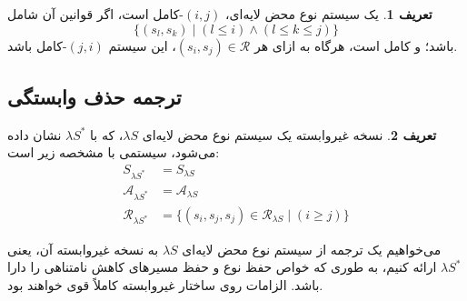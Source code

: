 \documentclass[11pt,twocolumn,a4paper,twoside]{article}
\theoremstyle{definition}
\newtheorem{definition}{تعریف}[section]
\theoremstyle{theorem}
\theoremstyle{definition}
\theoremstyle{definition}
\theoremstyle{definition}
\theoremstyle{definition}
\theoremstyle{definition}
\begin{document}
\begin{definition}
یک سیستم نوع محض لایه‌ای،
$(i,j)$-کامل 
است، اگر قوانین آن شامل
\vspace{-5pt}
\begin{equation*}
\{(s_l,s_k) \mid (l \le i) \land (l \le k \le j)\}
\end{equation*}
باشد؛ و کامل است، هرگاه به ازای هر
$(s_i,s_j) \in \mathcal{R}$،
این سیستم
$(j,i)$-کامل باشد.
\end{definition}

\subsection{ترجمه حذف وابستگی}

\begin{definition}\label{non_dependent}
نسخه غیروابسته یک سیستم نوع محض لایه‌ای
$\lambda S$،
که با
$\lambda S^*$
نشان داده می‌شود، سیستمی با مشخصه زیر است:
\vspace{-5pt}
\begin{align*}
S_{\lambda S^*} &= S_{\lambda S}\\
\mathcal{A}_{\lambda S^*} &= \mathcal{A}_{\lambda S}\\
\mathcal{R}_{\lambda S^*} &= \{(s_i,s_j,s_j) \in \mathcal{R}_{\lambda S} \mid (i \ge j)\}
\end{align*}
\end{definition}

می‌خواهیم یک ترجمه از سیستم نوع محض لایه‌ای
$\lambda S$
به نسخه غیروابسته آن، یعنی
$\lambda S^*$
ارائه کنیم، به طوری که خواص حفظ نوع و حفظ مسیرهای کاهش نامتناهی را دارا باشد. الزامات روی ساختار غیروابسته کاملاً قوی خواهند بود.
\end{document}
